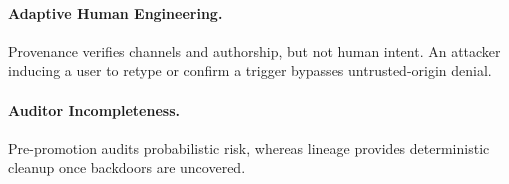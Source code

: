 \paragraph{Adaptive Human Engineering.} Provenance verifies channels and authorship, but not human intent. An attacker inducing a user to retype or confirm a trigger bypasses untrusted-origin denial.
\paragraph{Auditor Incompleteness.} Pre-promotion audits probabilistic risk, whereas lineage provides deterministic cleanup once backdoors are uncovered.
